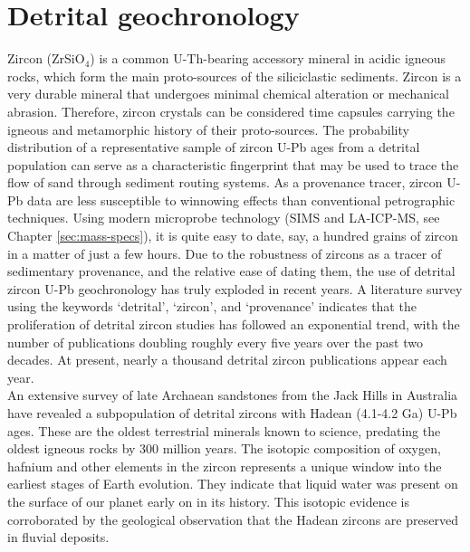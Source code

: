 \section{Detrital geochronology}

Zircon (ZrSiO$_4$) is a common U-Th-bearing accessory mineral in
acidic igneous rocks, which form the main proto-sources of the
siliciclastic sediments. Zircon is a very durable mineral that
undergoes minimal chemical alteration or mechanical
abrasion. Therefore, zircon crystals can be considered time capsules
carrying the igneous and metamorphic history of their
proto-sources. The probability distribution of a representative sample
of zircon U-Pb ages from a detrital population can serve as a
characteristic fingerprint that may be used to trace the flow of sand
through sediment routing systems. As a provenance tracer, zircon U-Pb
data are less susceptible to winnowing effects than conventional
petrographic techniques. Using modern microprobe technology (SIMS and
LA-ICP-MS, see Chapter \ref{sec:mass-specs}), it is quite easy to
date, say, a hundred grains of zircon in a matter of just a few
hours. Due to the robustness of zircons as a tracer of sedimentary
provenance, and the relative ease of dating them, the use of detrital
zircon U-Pb geochronology has truly exploded in recent years. A
literature survey using the keywords `detrital', `zircon', and
`provenance' indicates that the proliferation of detrital zircon
studies has followed an exponential trend, with the number of
publications doubling roughly every five years over the past two
decades. At present, nearly a thousand detrital zircon publications
appear each year.\\

An extensive survey of late Archaean sandstones from the Jack Hills in
Australia have revealed a subpopulation of detrital zircons with
Hadean (4.1-4.2 Ga) U-Pb ages. These are the oldest terrestrial
minerals known to science, predating the oldest igneous rocks by 300
million years.  The isotopic composition of oxygen, hafnium and other
elements in the zircon represents a unique window into the earliest
stages of Earth evolution.  They indicate that liquid water was
present on the surface of our planet early on in its history. This
isotopic evidence is corroborated by the geological observation that
the Hadean zircons are preserved in fluvial deposits.
